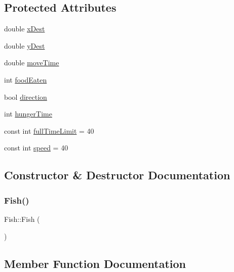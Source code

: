 \subsection*{Protected Attributes}
\begin{DoxyCompactItemize}
\item 
double \mbox{\hyperlink{class_fish_a8016badef0a39101994d62825dc69504}{x\+Dest}}
\item 
double \mbox{\hyperlink{class_fish_a27b5905734d7d9f8f3a87fca6fbe2018}{y\+Dest}}
\item 
double \mbox{\hyperlink{class_fish_a44bb72a7856095a8fc17f59b45602bad}{move\+Time}}
\item 
int \mbox{\hyperlink{class_fish_aff94d90077eb91db9f32c518b1dda1aa}{food\+Eaten}}
\item 
bool \mbox{\hyperlink{class_fish_aad304102219bdb3d333df50d8a74fd9d}{direction}}
\item 
int \mbox{\hyperlink{class_fish_a3fc20ca5c769db904d67492f578ecd9a}{hunger\+Time}}
\item 
const int \mbox{\hyperlink{class_fish_aaeccf31f823eb7319bb5201dbf05174a}{full\+Time\+Limit}} = 40
\item 
const int \mbox{\hyperlink{class_fish_a2f84c2eeb84451bc55156ae9da753cc9}{speed}} = 40
\end{DoxyCompactItemize}


\subsection{Constructor \& Destructor Documentation}
\mbox{\label{class_fish_a265fa9dc23037b5f621ff5f2b2731e9b}} 
\subsubsection{\texorpdfstring{Fish()}{Fish()}}
{\footnotesize\ttfamily Fish\+::\+Fish (\begin{DoxyParamCaption}{ }\end{DoxyParamCaption})}



\subsection{Member Function Documentation}
\mbox{\label{class_fish_aad629fb35c786b2a44c1204d011f9ae4}} 

